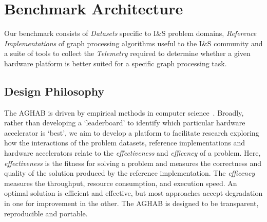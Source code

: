 \section{Benchmark Architecture}\label{section:architecture}
Our benchmark consists of \textit{Datasets} specific to I\&S problem domains, \textit{Reference Implementations} of graph processing algorithms useful to the I\&S community and a suite of tools to collect the \textit{Telemetry} required to determine whether a given hardware platform is better suited for a specific graph processing task. 

\subsection{Design Philosophy}
The AGHAB is driven by empirical methods in computer science~\cite{Hooker1994, Hooker1995, Mcgeoch1996}.
Broadly, rather than developing a `leaderboard' to identify which particular hardware accelerator is `best', we aim to develop a platform to facilitate research exploring how the interactions of the problem datasets, reference implementations and hardware accelerators relate to the \textit{effectiveness} and \textit{efficency} of a problem. 
Here, \textit{effectiveness} is the fitness for solving a problem and measures the correctness and quality of the solution produced by the reference implementation. 
The \textit{efficency} measures the throughput, resource consumption, and execution speed.
An optimal solution is efficient and effective, but most approaches accept degradation in one for improvement in the other. 
The AGHAB is designed to be transparent, reproducible and portable.

